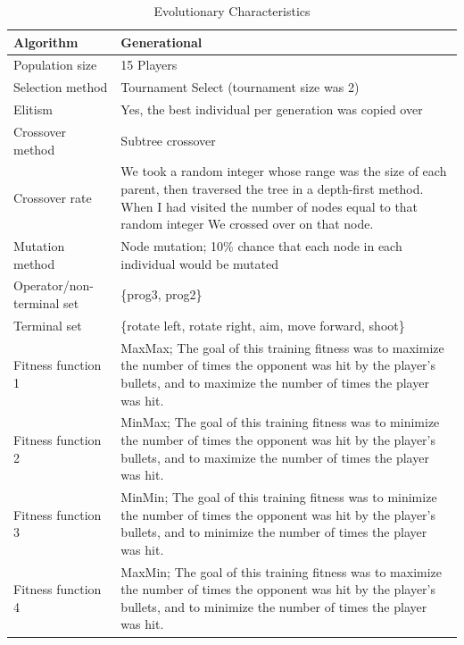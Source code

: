 \documentclass{acm_proc_article-sp}
\begin{document}
\begin{table}
\centering
\caption{Evolutionary Characteristics}
\label{evochar}
\begin{tabular}{|l|p{4in}|}
\hline
Algorithm & Generational\\
\hline
Population size & 15 Players\\
\hline
Selection method & Tournament Select (tournament size was 2)\\
\hline
Elitism & Yes, the best individual per generation was copied over\\
\hline
Crossover method & Subtree crossover\\
\hline
Crossover rate & We took a random integer whose range was the size of each parent, then traversed the tree in a depth-first method. When I had visited the number of nodes equal to that random integer We crossed over on that node.\\
\hline
Mutation method & Node mutation; 10\% chance that each node in each individual would be mutated\\
\hline
Operator/non-terminal set & \{prog3, prog2\}\\
\hline
Terminal set & \{rotate left, rotate right, aim, move forward, shoot\}\\
\hline
Fitness function 1 & MaxMax; The goal of this training fitness was to maximize the number of times the opponent was hit by the player's bullets, and to maximize the number of times the player was hit. \\
\hline
Fitness function 2 & MinMax; The goal of this training fitness was to minimize the number of times the opponent was hit by the player's bullets, and to maximize the number of times the player was hit. \\
\hline
Fitness function 3 & MinMin; The goal of this training fitness was to minimize the number of times the opponent was hit by the player's bullets, and to minimize the number of times the player was hit. \\
\hline
Fitness function 4 & MaxMin; The goal of this training fitness was to maximize the number of times the opponent was hit by the player's bullets, and to minimize the number of times the player was hit. \\
\hline
\end{tabular}
\end{table}
\end{document}
